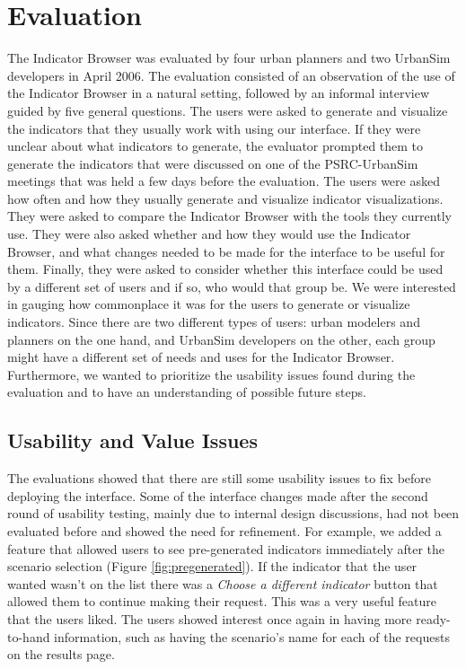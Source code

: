 
\section{Evaluation}
\label{sec:evaluation}

The Indicator Browser was evaluated by four urban planners and two UrbanSim
developers in April 2006. The evaluation consisted of an observation of the
use of the Indicator Browser in a natural setting, followed by an informal
interview guided by five general questions.  The users were asked to
generate and visualize the indicators that they usually work with using our
interface. If they were unclear about what indicators to generate, the
evaluator prompted them to generate the indicators that were discussed on
one of the PSRC-UrbanSim meetings that was held a few days before the
evaluation.  The users were asked how often and how they usually generate
and visualize indicator visualizations. They were asked to compare the
Indicator Browser with the tools they currently use. They were also asked
whether and how they would use the Indicator Browser, and what changes
needed to be made for the interface to be useful for them. Finally,
they were asked to consider whether this interface could be used by a
different set of users and if so, who would that group be. We were
interested in gauging how commonplace it was for the users to generate or
visualize indicators.  Since there are two different types of users: urban
modelers and planners on the one hand, and UrbanSim developers on the other,
each group might have a
different set of needs and uses for the Indicator Browser. Furthermore, we
wanted to prioritize the usability issues found during the evaluation and
to have an understanding of possible future steps.

\subsection{Usability and Value Issues}


The evaluations showed that there are still some usability issues to fix
before deploying the interface.  Some of the interface changes made after
the second round of usability testing, mainly due to internal design
discussions, had not been evaluated before and showed the need for
refinement. For example, we added a feature that allowed users to see
pre-generated indicators immediately after the scenario selection (Figure
\ref{fig:pregenerated}).  If the indicator that the user wanted wasn't on
the list there was a \emph{Choose a different indicator} button that allowed
them to continue making their request. This was a very useful feature that
the users liked.  The users showed interest once again in having 
more ready-to-hand information, such as having the scenario's name 
for each of the requests on the results page.

